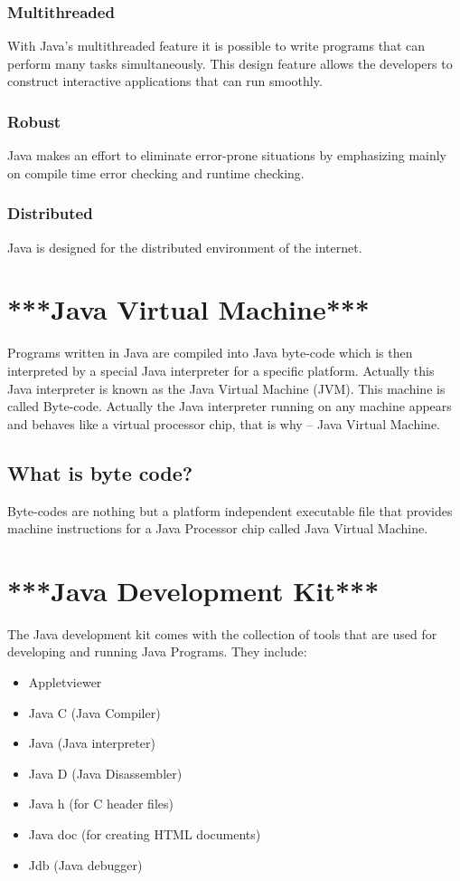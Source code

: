 \documentclass[twocolumn, a4paper]{article}
\begin{document}
\subsubsection{Multithreaded}%
With Java's multithreaded feature it is possible to write programs that can
perform many tasks simultaneously. This design feature allows the developers
to construct interactive applications that can run smoothly.%

\subsubsection{Robust}%
Java makes an effort to eliminate error-prone situations by emphasizing mainly
on compile time error checking and runtime checking.%

\subsubsection{Distributed}%
Java is designed for the distributed environment of the internet.%


\section{***Java Virtual Machine***}
Programs written in Java are compiled into Java byte-code which is then
interpreted by a special Java interpreter for a specific platform. Actually
this Java interpreter is known as the Java Virtual Machine (JVM). This machine
is called Byte-code. Actually the Java interpreter running on any machine
appears and behaves like a virtual processor chip, that is why -- Java Virtual
Machine.

\subsection{What is byte code?}
Byte-codes are nothing but a platform independent executable file that
provides machine instructions for a Java Processor chip called Java Virtual
Machine.

\section{***Java Development Kit***}
The Java development kit comes with the collection of tools that are used for
developing and running Java Programs. They include:
\begin{itemize}
  \item Appletviewer
  \item Java C (Java Compiler)
  \item Java (Java interpreter)
  \item Java D (Java Disassembler)
  \item Java h (for C header files)
  \item Java doc (for creating HTML documents)
  \item Jdb (Java debugger)
\end{itemize}
\end{document}
